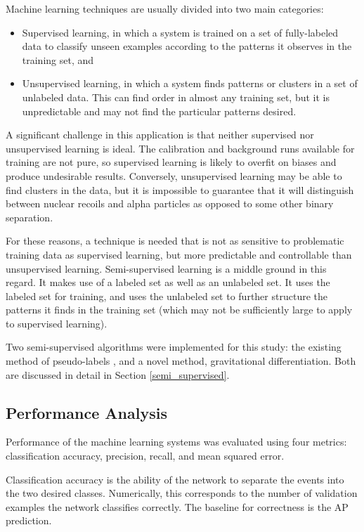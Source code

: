 \documentclass[10pt]{article}
\begin{document}
Machine learning techniques are usually divided into two main categories:

\begin{itemize}
    \item Supervised learning, in which a system is trained on a set of fully-labeled data to classify unseen examples according to the patterns it observes in the training set, and
    \item Unsupervised learning, in which a system finds patterns or clusters in a set of unlabeled data. This can find order in almost any training set, but it is unpredictable and may not find the particular patterns desired.
\end{itemize}

A significant challenge in this application is that neither supervised nor unsupervised learning is ideal. The calibration and background runs available for training are not pure, so supervised learning is likely to overfit on biases and produce undesirable results. Conversely, unsupervised learning may be able to find clusters in the data, but it is impossible to guarantee that it will distinguish between nuclear recoils and alpha particles as opposed to some other binary separation.

For these reasons, a technique is needed that is not as sensitive to problematic training data as supervised learning, but more predictable and controllable than unsupervised learning. Semi-supervised learning is a middle ground in this regard. It makes use of a labeled set as well as an unlabeled set. It uses the labeled set for training, and uses the unlabeled set to further structure the patterns it finds in the training set (which may not be sufficiently large to apply to supervised learning).

Two semi-supervised algorithms were implemented for this study: the existing method of pseudo-labels \cite{pseudo}, and a novel method, gravitational differentiation. Both are discussed in detail in Section \ref{semi_supervised}.

\subsection{Performance Analysis}

Performance of the machine learning systems was evaluated using four metrics: classification accuracy, precision, recall, and mean squared error.

Classification accuracy is the ability of the network to separate the events into the two desired classes. Numerically, this corresponds to the number of validation examples the network classifies correctly. The baseline for correctness is the AP prediction.
\end{document}
